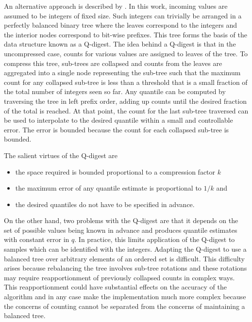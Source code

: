 \documentclass[]{statsoc}
\begin{document}
An alternative approach is described by  \citet{qdigest}.  In this work, incoming values are assumed to be integers of fixed size. Such integers can trivially be arranged in a perfectly balanced binary tree where the leaves correspond to the integers and the interior nodes correspond to bit-wise prefixes. This tree forms the basis of the data structure known as a Q-digest.  The idea behind a Q-digest is that in the uncompressed case, counts for various values are assigned to leaves of the tree.  To compress this tree, sub-trees are collapsed and counts from the leaves are aggregated into a single node representing the sub-tree such that the maximum count for any collapsed sub-tree is less than a threshold that is a small fraction of the total number of integers seen so far.  Any quantile can be computed by traversing the tree in left prefix order, adding up counts until the desired fraction of the total is reached.  At that point, the count for the last sub-tree traversed can be used to interpolate to the desired quantile within a small and controllable error.  The error is bounded because the count for each collapsed sub-tree is bounded.

The salient virtues of the Q-digest are
\begin{itemize}[nosep, topsep=-10pt]
\item the space required is bounded proportional to a compression factor $k$
\item the maximum error of any quantile estimate is proportional to $1/k$ and
\item the desired quantiles do not have to be specified in advance.
\vspace{10pt}
\end{itemize}

On the other hand, two problems with the Q-digest are that it depends on the set of possible values being known in advance and produces quantile estimates with constant error in $q$. In practice, this limits application of the Q-digest to samples which can be identified with the integers. Adapting the Q-digest to use a balanced tree over arbitrary elements of an ordered set is difficult.  This difficulty arises because rebalancing the tree involves sub-tree rotations and these rotations may require reapportionment of previously collapsed counts in complex ways.  This reapportionment could have substantial effects on the accuracy of the algorithm and in any case make the implementation much more complex because the concerns of counting cannot be separated from the concerns of maintaining a balanced tree.  
\end{document}
